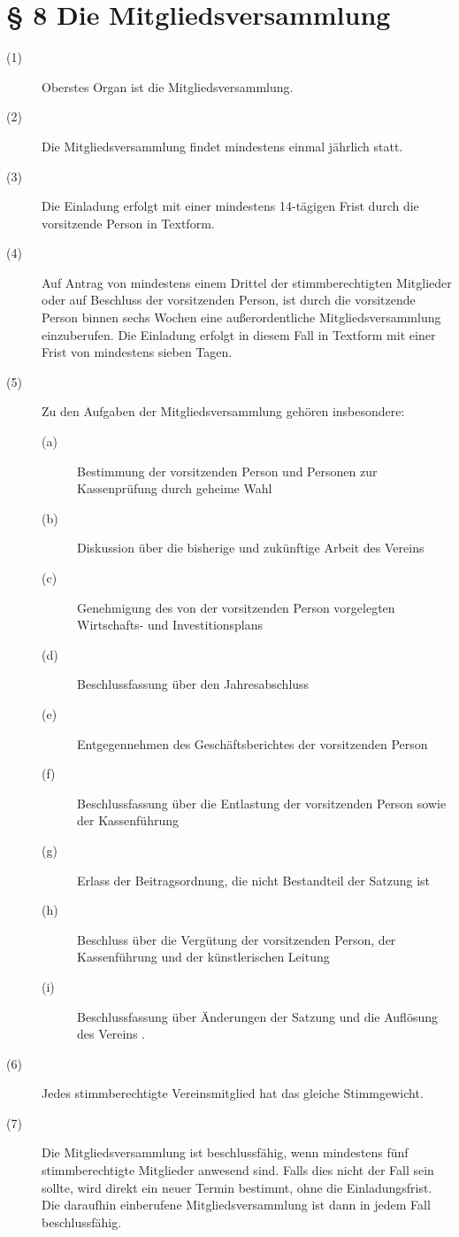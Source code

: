 \documentclass[a4paper,12pt]{scrartcl}
\begin{document}
\section*{\S{} 8 Die Mitgliedsversammlung}
\begin{description} 

\item[(1)] Oberstes Organ ist die Mitgliedsversammlung.
\item[(2)] Die Mitgliedsversammlung findet mindestens einmal jährlich statt.
\item[(3)] Die Einladung erfolgt mit einer mindestens 14-tägigen Frist durch die vorsitzende Person in Textform.
\item[(4)] Auf Antrag von mindestens einem Drittel der stimmberechtigten Mitglieder oder auf Beschluss der vorsitzenden Person, ist durch die vorsitzende Person binnen sechs Wochen eine außerordentliche Mitgliedsversammlung einzuberufen. Die Einladung erfolgt in diesem Fall in Textform mit einer Frist von mindestens sieben Tagen.
\item[(5)] Zu den Aufgaben der Mitgliedsversammlung gehören insbesondere:
\begin{description} 
\item[(a)] Bestimmung der vorsitzenden Person und Personen zur Kassenprüfung durch geheime Wahl
\item[(b)] Diskussion über die bisherige und zukünftige Arbeit des Vereins
\item[(c)] Genehmigung des von der vorsitzenden Person vorgelegten Wirtschafts- und Investitionsplans
\item[(d)] Beschlussfassung über den Jahresabschluss
\item[(e)] Entgegennehmen des Geschäftsberichtes der vorsitzenden Person
\item[(f)] Beschlussfassung über die Entlastung der vorsitzenden Person sowie der Kassenführung
\item[(g)] Erlass der Beitragsordnung, die nicht Bestandteil der Satzung ist
\item[(h)] Beschluss über die Vergütung der vorsitzenden Person, der Kassenführung und der künstlerischen Leitung
\item[(i)] Beschlussfassung über Änderungen der Satzung und die Auflösung des Vereins .
\end{description}
\item[(6)] Jedes stimmberechtigte Vereinsmitglied hat das gleiche Stimmgewicht.
\item[(7)] Die Mitgliedsversammlung ist beschlussfähig, wenn mindestens fünf stimmberechtigte Mitglieder anwesend sind. Falls dies nicht der Fall sein sollte, wird direkt ein neuer Termin bestimmt, ohne die Einladungsfrist. Die daraufhin einberufene Mitgliedsversammlung ist dann in jedem Fall beschlussfähig.

\end{description}
\end{document}
